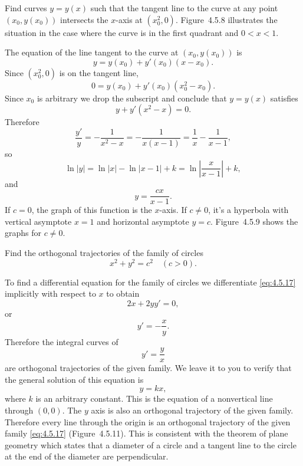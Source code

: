 \setcounter{example}{7}
\begin{example}
  \label{example:4.5.8}\rm Find curves $y=y(x)$ such that the tangent line to the curve at any point
  $(x_{0},y(x_{0}))$ intersects the $x$-axis at $(x^{2}_{0},0)$. Figure~4.5.8
  illustrates the situation in the case where the curve is in the first quadrant and $0<x<1$.
\end{example}
\begin{examplesolution}
\solution The equation of the line tangent to the curve at $(x_{0},y(x_{0}))$ is
\[
  y=y(x_{0})+y'(x_{0})(x-x_{0}).
\]
Since $(x^{2}_{0},0)$ is on the tangent line,
\[
  0=y(x_{0})+y'(x_{0})(x^{2}_{0}-x_{0}).
\]
Since $x_{0}$ is arbitrary we drop the subscript and conclude that $y=y(x)$ satisfies
\[
  y+y'(x^{2}-x)=0.
\]
Therefore
\[
  \frac{y'}{y}=-\frac{1}{x^{2}-x}=-\frac{1}{x(x-1)}=\frac{1}{x}-\frac{1}{x-1},
\]
so
\[
  \ln|y|=\ln|x|-\ln|x-1|+k= \ln\left|\frac{x}{x-1}\right|+k,
\]
and
\[
  y=\frac{cx}{x-1}.
\]
If $c=0$, the graph of this function is the $x$-axis. If $c\ne0$, it's a hyperbola with vertical
asymptote $x=1$ and horizontal asymptote $y=c$. Figure~4.5.9 shows the graphs for
$c\ne0$.
\end{examplesolution}

\setcounter{example}{8}
\setcounter{equation}{16}
\begin{example}
  \label{example:4.5.9} \rm Find the orthogonal trajectories of the family of circles
  \begin{equation}
    \label{eq:4.5.17}x^{2}+y^{2}=c^{2}\quad(c>0).
  \end{equation}
\end{example}
\begin{examplesolution}
\solution To find a differential equation for the family of circles we differentiate
\eqref{eq:4.5.17} implicitly with respect to $x$ to obtain
\[
  2x+2yy'=0,
\]
or
\[
  y'=-\frac{x}{y}.
\]
Therefore the integral curves of
\[
  y'=\frac{y}{x}
\]
are orthogonal trajectories of the given family. We leave it to you to verify that the general
solution of this equation is
\[
  y=kx,
\]
where $k$ is an arbitrary constant. This is the equation of a nonvertical line through $(0,0)$. The
$y$ axis is also an orthogonal trajectory of the given family. Therefore every line through the
origin is an orthogonal trajectory of the given family \eqref{eq:4.5.17}
(Figure~4.5.11). This is consistent with the theorem of plane geometry which states
that a diameter of a circle and a tangent line to the circle at the end of the diameter are
perpendicular.
\end{examplesolution}

